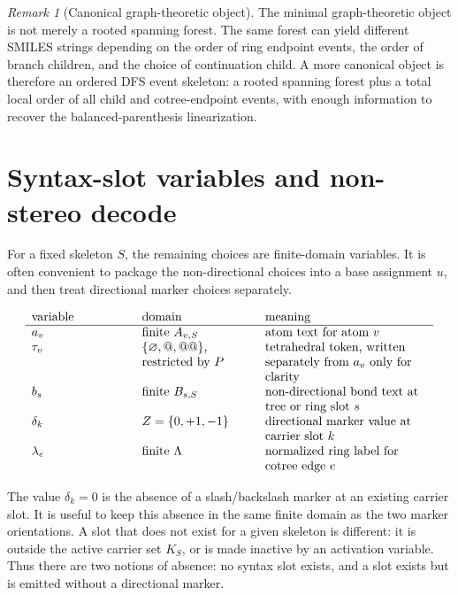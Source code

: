 \documentclass[10pt,a4paper]{article}
\theoremstyle{definition}
\theoremstyle{remark}
\newtheorem{remark}[lemma]{Remark}
\begin{document}
	\begin{remark}[Canonical graph-theoretic object]
		The minimal graph-theoretic object is not merely a rooted spanning forest.  The
		same forest can yield different SMILES strings depending on the order of ring
		endpoint events, the order of branch children, and the choice of continuation
		child.  A more canonical object is therefore an ordered DFS event skeleton: a
		rooted spanning forest plus a total local order of all child and cotree-endpoint
		events, with enough information to recover the balanced-parenthesis
		linearization.
	\end{remark}

	\section{Syntax-slot variables and non-stereo decode}
	\label{s:variables}

	For a fixed skeleton \(S\), the remaining choices are finite-domain variables.
	It is often convenient to package the non-directional choices into a base
	assignment \(u\), and then treat directional marker choices separately.

	\[
	\begin{array}{>{\raggedright\arraybackslash}p{0.23\linewidth}
			>{\raggedright\arraybackslash}p{0.26\linewidth}
			>{\raggedright\arraybackslash}p{0.38\linewidth}}
		\text{variable} & \text{domain} & \text{meaning} \\
		\hline
		\(a_v\) & finite \(A_{v,S}\) & atom text for atom \(v\) \\
		\(\tau_v\) & \(\{\varnothing,@,@@\}\), restricted by \(P\) & tetrahedral token, written separately from \(a_v\) only for clarity \\
		\(b_s\) & finite \(B_{s,S}\) & non-directional bond text at tree or ring slot \(s\) \\
		\(\delta_k\) & \(Z=\{0,+1,-1\}\) & directional marker value at carrier slot \(k\) \\
		\(\lambda_e\) & finite \(\Lambda\) & normalized ring label for cotree edge \(e\)
	\end{array}
	\]

	The value \(\delta_k=0\) is the absence of a slash/backslash marker at an
	existing carrier slot.  It is useful to keep this absence in the same finite
	domain as the two marker orientations.  A slot that does not exist for a given
	skeleton is different: it is outside the active carrier set \(K_S\), or is made
	inactive by an activation variable.  Thus there are two notions of absence: no
	syntax slot exists, and a slot exists but is emitted without a directional
	marker.
\end{document}
